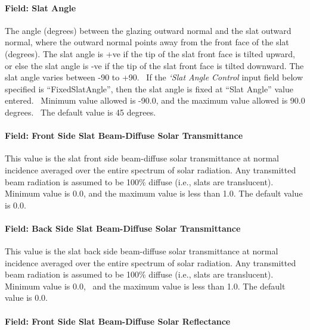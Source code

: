 \paragraph{Field: Slat Angle}\label{field-slat-angle-2}

The angle (degrees) between the glazing outward normal and the slat outward normal, where the outward normal points away from the front face of the slat (degrees). The slat angle is +ve if the tip of the slat front face is tilted upward, or else the slat angle is -ve if the tip of the slat front face is tilted downward. The slat angle varies between -90 to +90.~ If the \textit{`Slat Angle Control} input field below specified is ``FixedSlatAngle'', then the slat angle is fixed at ``Slat Angle'' value entered.~ Minimum value allowed is -90.0, and the maximum value allowed is 90.0 degrees.~ The default value is 45 degrees.

\paragraph{Field: Front Side Slat Beam-Diffuse Solar Transmittance}\label{field-front-side-slat-beam-diffuse-solar-transmittance}

This value is the slat front side beam-diffuse solar transmittance at normal incidence averaged over the entire spectrum of solar radiation. Any transmitted beam radiation is assumed to be 100\% diffuse (i.e., slats are translucent). Minimum value is 0.0, and the maximum value is less than 1.0. The default value is 0.0.

\paragraph{Field: Back Side Slat Beam-Diffuse Solar Transmittance}\label{field-back-side-slat-beam-diffuse-solar-transmittance}

This value is the slat back side beam-diffuse solar transmittance at normal incidence averaged over the entire spectrum of solar radiation. Any transmitted beam radiation is assumed to be 100\% diffuse (i.e., slats are translucent). Minimum value is 0.0,~ and the maximum value is less than 1.0. The default value is 0.0.

\paragraph{Field: Front Side Slat Beam-Diffuse Solar Reflectance}\label{field-front-side-slat-beam-diffuse-solar-reflectance}

